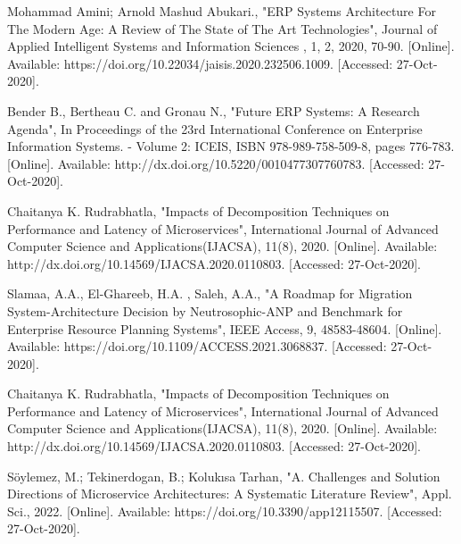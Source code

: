 \begin{thebibliography}{30}
    
{ Mohammad Amini; Arnold Mashud Abukari., "ERP Systems Architecture For The Modern Age: A Review of The State of The Art Technologies", Journal of Applied Intelligent Systems and Information Sciences , 1, 2, 2020, 70-90. [Online]. Available: https://doi.org/10.22034/jaisis.2020.232506.1009. [Accessed: 27-Oct-2020].}

{ Bender B., Bertheau C. and Gronau N., "Future ERP Systems: A Research Agenda", In Proceedings of the 23rd International Conference on Enterprise Information Systems. - Volume 2: ICEIS, ISBN 978-989-758-509-8, pages 776-783. [Online]. Available: http://dx.doi.org/10.5220/0010477307760783. [Accessed: 27-Oct-2020].}

{ Chaitanya K. Rudrabhatla, "Impacts of Decomposition Techniques on Performance and Latency of Microservices",  International Journal of Advanced Computer Science and Applications(IJACSA), 11(8), 2020. [Online]. Available: http://dx.doi.org/10.14569/IJACSA.2020.0110803. [Accessed: 27-Oct-2020].}

{ Slamaa, A.A., El-Ghareeb, H.A. , Saleh, A.A., "A Roadmap for Migration System-Architecture Decision by Neutrosophic-ANP and Benchmark for Enterprise Resource Planning Systems", IEEE Access, 9, 48583-48604. [Online]. Available: https://doi.org/10.1109/ACCESS.2021.3068837. [Accessed: 27-Oct-2020].}

{ Chaitanya K. Rudrabhatla, "Impacts of Decomposition Techniques on Performance and Latency of Microservices", International Journal of Advanced Computer Science and Applications(IJACSA), 11(8), 2020. [Online]. Available: http://dx.doi.org/10.14569/IJACSA.2020.0110803. [Accessed: 27-Oct-2020].}

{ Söylemez, M.; Tekinerdogan, B.; Kolukısa Tarhan, "A. Challenges and Solution Directions of Microservice Architectures: A Systematic Literature Review", Appl. Sci., 2022. [Online]. Available: https://doi.org/10.3390/app12115507. [Accessed: 27-Oct-2020].}

\end{thebibliography}